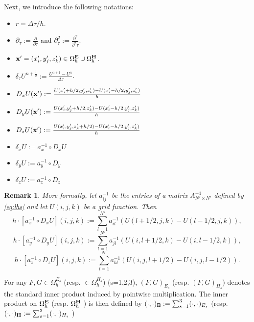 \documentclass[12pt,reqno]{amsart}
\newcommand{\e}{{\bf E}}
\newcommand{\h}{{\bf H}}
\newtheorem{remark}[theorem]{Remark}
\theoremstyle{definition}
\numberwithin{equation}{section}
\def\Gwh{\Omega_h}
\begin{document}
   Next, we introduce the following notations:
	\begin{itemize}
		\item $r=\Delta \tau/h$.\\[1mm]
		\item  $\partial_{\tau}:=\frac{\partial}{\partial \tau}$ and $\partial_{\tau}^2:=\frac{\partial^2}{\partial^2 \tau}$.\\[1mm]
		\item ${\bf x'}=(x_i',y_j',z_k')\in \Gwh^\e\cup\Gwh^\h$.\\[1mm]
		\item $\delta_{\tau} U^{n+\frac{1}{2}}:=\frac{U^{n+1}-U^{n}}{\Delta \tau}$.\\[1mm]
				\item $D_x U({\bf x'}):=\frac{U(x_i'+h/2,y_j',z_k')-U(x_i'-h/2,y_j',z_k')}{h}$\\[1mm]
	\item $D_y U({\bf x'}):=\frac{U(x_i',y_j'+h/2,z_k')-U(x_i'-h/2,y_j',z_k')}{h}$\\[1mm]
		\item $D_z U({\bf x'}):=\frac{U(x_i',y_j',z_k'+h/2)-U(x_i'-h/2,y_j',z_k')}{h}$\\[1mm]
		\item $\delta_x U:=a_x^{-1}\circ D_xU$\\[1mm]
		\item $\delta_y U:=a_y^{-1}\circ D_y$\\[1mm]
		\item 	$\delta_z U:=a_z^{-1}\circ D_z$\\[1mm]
	\end{itemize} 
\begin{remark}
More formally, let $a_{ij}^{-1}$ be the entries of a matrix $A_{N'\times N'}^{-1}$  defined by \eqref{eq:lhs}  and let $U(i,j,k)$ be a grid function.
Then 
$$h\cdot [a_x^{-1}\circ D_xU](i,j,k):=\sum_{l=1}^{N'} a_{il}^{-1}(U(l+1/2,j,k)-U(l-1/2,j,k)),$$
$$h\cdot [a_y^{-1}\circ D_yU](i,j,k):=\sum_{l=1}^{N'} a_{jl}^{-1}(U(i,l+1/2,k)-U(i,l-1/2,k)),$$
$$h\cdot [a_z^{-1}\circ D_zU](i,j,k):=\sum_{l=1}^{N'} a_{kl}^{-1}(U(i,j,l+1/2)-U(i,j,l-1/2)).$$
\end{remark}

For any $F,G\in \Gwh^{E_s}$ (resp. $\in\Gwh^{H_s}$) (s=1,2,3), $(F,G)_{E_s}$
(resp. $(F,G)_{H_s}$)
denotes the standard inner product induced by pointwise multiplication.
The inner product on $\Gwh^\e$ (resp. $\Gwh^\h$ ) is then defined by $(\cdot,\cdot)_\e:=\sum_{s=1}^3(\cdot,\cdot)_{E_s}$ (resp. 
$(\cdot,\cdot)_\h:=\sum_{s=1}^3(\cdot,\cdot)_{H_s}$
)
\end{document}

